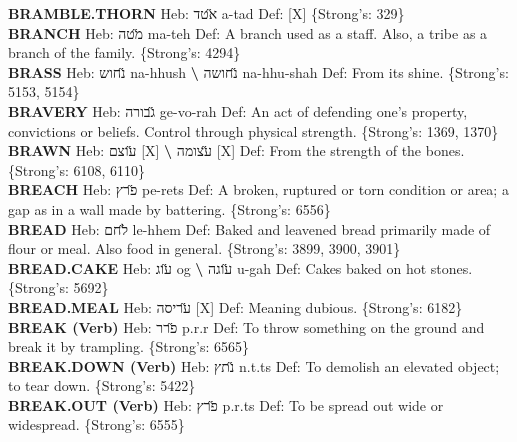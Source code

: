 {\textbf{BRAMBLE.THORN} Heb: {\large\H אטד} a-tad Def: {[}X{]} \{Strong's: 329\}\hfill{}\\

\textbf{BRANCH} Heb: {\large\H מטה} ma-teh Def: A branch used as a staff. Also, a tribe as a branch of the family. \{Strong's: 4294\}\hfill{}\\

\textbf{BRASS} Heb: {\large\H נחוש} na-hhush \textbf{\textbackslash{}} {\large\H נחושה} na-hhu-shah Def: From its shine. \{Strong's: 5153, 5154\}\hfill{}\\

\textbf{BRAVERY} Heb: {\large\H גבורה} ge-vo-rah Def: An act of defending one's property, convictions or beliefs. Control through physical strength. \{Strong's: 1369, 1370\}\hfill{}\\

\textbf{BRAWN} Heb: {\large\H עוצם} {[}X{]} \textbf{\textbackslash{}} {\large\H עצומה} {[}X{]} Def: From the strength of the bones. \{Strong's: 6108, 6110\}\hfill{}\\

\textbf{BREACH} Heb: {\large\H פרץ} pe-rets Def: A broken, ruptured or torn condition or area; a gap as in a wall made by battering. \{Strong's: 6556\}\hfill{}\\

\textbf{BREAD} Heb: {\large\H לחם} le-hhem Def: Baked and leavened bread primarily made of flour or meal. Also food in general. \{Strong's: 3899, 3900, 3901\}\hfill{}\\

\textbf{BREAD.CAKE} Heb: {\large\H עוג} og \textbf{\textbackslash{}} {\large\H עוגה} u-gah Def: Cakes baked on hot stones. \{Strong's: 5692\}\hfill{}\\

\textbf{BREAD.MEAL} Heb: {\large\H עריסה} {[}X{]} Def: Meaning dubious. \{Strong's: 6182\}\hfill{}\\

\textbf{BREAK (Verb)} Heb: {\large\H פרר} p.r.r Def: To throw something on the ground and break it by trampling. \{Strong's: 6565\}\hfill{}\\

\textbf{BREAK.DOWN (Verb)} Heb: {\large\H נתץ} n.t.ts Def: To demolish an elevated object; to tear down. \{Strong's: 5422\}\hfill{}\\

\textbf{BREAK.OUT (Verb)} Heb: {\large\H פרץ} p.r.ts Def: To be spread out wide or widespread. \{Strong's: 6555\}\hfill{}\\

}
